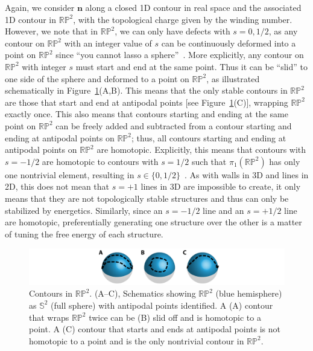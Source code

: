 Again, we consider $\mathbf{n}$ along a closed 1D contour in real space and the associated 1D contour in $\mathbb{R}\mathbb{P}^2$, with the topological charge given by the winding number.
However, we note that in $\mathbb{R}\mathbb{P}^2$, we can only have defects with $s =0,1/2$, as any contour on $\mathbb{R}\mathbb{P}^2$ with an integer value of $s$ can be continuously deformed into a point on $\mathbb{R}\mathbb{P}^2$ since ``you cannot lasso a sphere''~\cite{RN153}.
More explicitly, any contour on  $\mathbb{R}\mathbb{P}^2$ with integer $s$ must start and end at the same point.
Thus it can be ``slid'' to one side of the sphere and deformed to a point on $\mathbb{R}\mathbb{P}^2$, as illustrated schematically in Figure~\ref{f:2-RP2}(A,B).
This means that the only stable contours in $\mathbb{R}\mathbb{P}^2$ are those that start and end at antipodal points [see Figure~\ref{f:2-RP2}(C)], wrapping $\mathbb{R}\mathbb{P}^2$ exactly once.
This also means that contours starting and ending at the same point on $\mathbb{R}\mathbb{P}^2$ can be freely added and subtracted from a contour starting and ending at antipodal points on $\mathbb{R}\mathbb{P}^2$; thus, all contours starting and ending at antipodal points on $\mathbb{R}\mathbb{P}^2$ are homotopic.
Explicitly, this means that contours with $s = -1/2$ are homotopic to contours with $s = 1/2$ such that $\pi_1(\mathbb{R}\mathbb{P}^2)$ has only one nontrivial element, resulting in $s \in \{ 0,1/2\}$~\cite{RN153}.
As with walls in 3D and lines in 2D, this does not mean that $s = +1$ lines in 3D are impossible to create, it only means that they are not topologically stable structures and thus can only be stabilized by energetics.
Similarly, since an $s = -1/2$ line and an $s = +1/2$ line are homotopic, preferentially generating one structure over the other is a matter of tuning the free energy of each structure.
\begin{figure}
  \centering
  \includegraphics{figures/C2/Ch2-Figs_RP2.png}
  \caption{Contours in $\mathbb{RP}^2$.
  (A--C), Schematics showing $\mathbb{RP}^2$ (blue hemisphere) as $\mathbb{S}^2$ (full sphere) with antipodal points identified.
  A (A) contour that wraps $\mathbb{RP}^2$ twice can be (B) slid off and is homotopic to a point.
  A (C) contour that starts and ends at antipodal points is not homotopic to a point and is the only nontrivial contour in $\mathbb{RP}^2$.}\label{f:2-RP2}
\end{figure}

